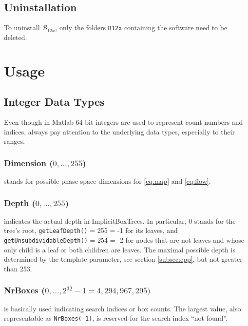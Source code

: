 \documentclass[a4paper,10pt,fleqn]{article}
\newcommand{\BTwelveVersion}[1]{\mathcal{B}_{12#1}}
\begin{document}
\subsection{Uninstallation} \label{subsec:uninstallation}

To uninstall $\BTwelveVersion{x}$, only the folders \verb$B12x$ containing the software need to be deleted.



\section{Usage} \label{sec:usage}

\subsection{Integer Data Types} \label{subsec:integer_data_types}

Even though in Matlab 64 bit integers are used to represent count numbers and indices, always pay attention to the underlying data types, especially to their ranges.

\subsubsection*{Dimension ($0, \ldots, 255$)}

stands for possible phase space dimensions for \eqref{eq:map} and \eqref{eq:flow}.

\subsubsection*{Depth ($0, \ldots, 255$)}

indicates the actual depth in ImplicitBoxTrees. In particular, 0 stands for the tree's root, \verb$getLeafDepth()$ = 255 = -1 for its leaves, and \verb$getUnsubdividableDepth()$ = 254 = -2 for nodes that are not leaves and whose only child is a leaf or both children are leaves. The maximal possible depth is determined by the template parameter, see section \ref{subsec:cpp}, but not greater than 253.

\subsubsection*{NrBoxes ($0, \ldots, 2^{32}-1 = 4,294,967,295)$}

is basically used indicating search indices or box counts. The largest value, also representable as \verb$NrBoxes(-1)$, is reserved for the search index ``not found''.
\end{document}
